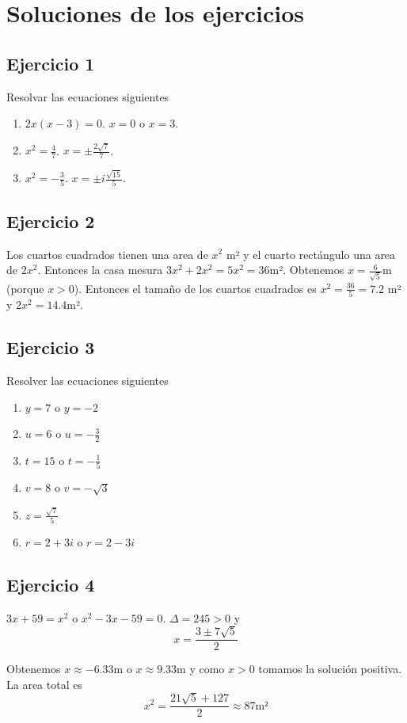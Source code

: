 \section{Soluciones de los ejercicios}

\subsection*{Ejercicio 1}

Resolvar las ecuaciones siguientes

\begin{enumerate}
\item $2x{(x - 3)} = 0$. $x = 0$ o $x = 3$.
\item $x^2 = \frac{4}{7}$. $x = \pm \frac{2\sqrt{7}}{7}$.
\item $x^2 = -\frac{3}{5}$. $x = \pm i \frac{\sqrt{15}}{5}$.
\end{enumerate}

\subsection*{Ejercicio 2}

Los cuartos cuadrados tienen una area de $x^2$ m² y el cuarto rectángulo
una area de $2x^2$. Entonces la casa mesura $3x^2 + 2x^2 = 5x^2 = 36$m².
Obtenemos $x = \frac{6}{\sqrt{5}}$m (porque $x > 0$).
Entonces el tamaño de los cuartos cuadrados es $x^2 = \frac{36}{5} = 7.2$ m² y
$2x^2 = 14.4$m².

\subsection*{Ejercicio 3}

Resolver las ecuaciones siguientes

\begin{enumerate}
\item $y = 7$ o $y=-2$
\item $u = 6$ o $u = -\frac{3}{2}$
\item $t = 15$ o $t = -\frac{1}{5}$
\item $v = 8$ o $v = -\sqrt{3}$
\item $z = \frac{\sqrt{7}}{5}$
\item $r = 2 + 3i$ o $r = 2 - 3i$
\end{enumerate}

\subsection*{Ejercicio 4}

$3x + 59 = x^2$ o $x^2 - 3x - 59 = 0$. $\Delta = 245 > 0$ y
$$x=\frac{3 \pm 7 \sqrt5}{2}$$

Obtenemos $x \approx -6.33$m o $x\approx9.33$m y como $x > 0$ tomamos la
solución positiva. La area total es
$$
x^2 = \frac{21 \sqrt5+127}{2} \approx 87 \text{m²}
$$
